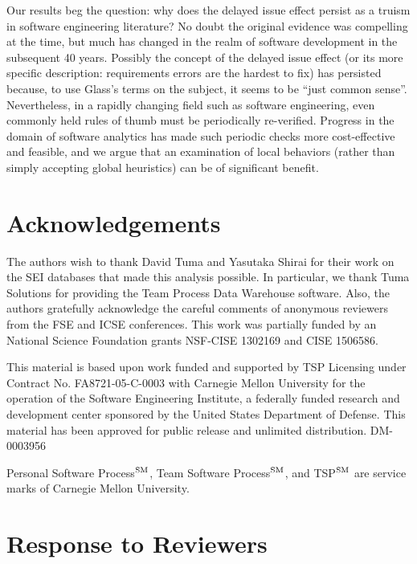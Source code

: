 \documentclass[smallcondensed]{svjour3}
\begin{document}
Our results beg the question: why does the delayed issue effect persist as a truism in software engineering literature? No doubt the original evidence was compelling at the time, but much has changed in the realm of software development in the subsequent 40 years. Possibly the concept of the delayed issue effect (or its more specific description: requirements errors are the hardest to fix)
has persisted because, to use Glass's terms on the subject, it seems to be ``just common sense''\cite{glass02}. 
Nevertheless, in a rapidly changing field such as software engineering, even commonly held rules of thumb must be periodically re-verified. 
Progress in the domain of software analytics has made such periodic checks more cost-effective and feasible, and we argue that an examination of local behaviors (rather than simply accepting global heuristics) can be of significant benefit.

  
 


\section*{Acknowledgements}
The authors wish to thank  David Tuma and  Yasutaka Shirai for their work on the SEI databases
that made this analysis possible.
In particular, we thank Tuma Solutions for providing the Team Process Data Warehouse software.
Also, the authors gratefully acknowledge the careful comments of anonymous reviewers from the
FSE and ICSE conferences.
This work was partially funded by an National Science
Foundation grants NSF-CISE 1302169 and CISE 1506586.

This material is based upon work funded and supported by TSP Licensing under Contract No. FA8721-05-C-0003 with Carnegie Mellon University for the operation of the Software Engineering Institute, a federally funded research and development center sponsored by the United States Department of Defense.  This material has been approved for public release and unlimited distribution.  DM-0003956

Personal Software Process$\textsuperscript{SM}$, Team Software Process$\textsuperscript{SM}$, and TSP$\textsuperscript{SM}$ are service marks of Carnegie Mellon University.

 
\vspace*{0.5mm} 
\balance

 

\newpage
{}
 \setcounter{page}{1}
 

 \section*{Response to Reviewers}
\end{document}
